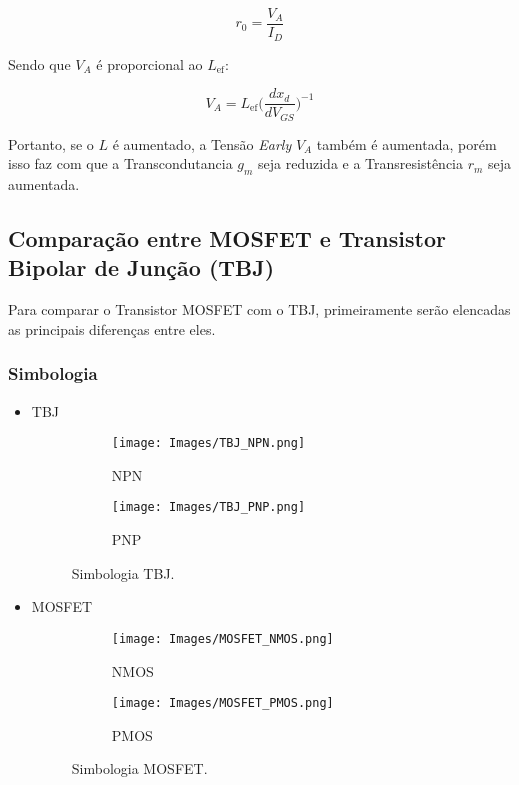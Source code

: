 \documentclass[12pt]{article}
\begin{document}
$$
  r_0 = \frac{V_A}{I_D}
$$

Sendo que $V_A$ é proporcional ao $L_{\text{ef}}$:

$$
  V_A = L_{\text{ef}} \Big ( \frac{dx_d}{dV_{GS}} \Big ) ^{-1}
$$

Portanto, se o $L$ é aumentado, a Tensão \textit{Early} $V_A$ também é aumentada, porém isso faz com que a Transcondutancia $g_m$ seja reduzida e a Transresistência $r_m$ seja aumentada.

\subsection{Comparação entre MOSFET e Transistor Bipolar de Junção (TBJ)}

Para comparar o Transistor MOSFET com o TBJ, primeiramente serão elencadas as principais diferenças entre eles.

\subsubsection{Simbologia}

\begin{itemize}
  \item TBJ
  
  \begin{figure}[H]
    \centering
    \begin{subfigure}{.5\linewidth}
      \centering
      \texttt{[image: Images/TBJ\_NPN.png]}
      \caption{NPN}
    \end{subfigure}%
    \begin{subfigure}{.5\linewidth}
      \centering
      \texttt{[image: Images/TBJ\_PNP.png]}
      \caption{PNP}
    \end{subfigure}
    \caption{Simbologia TBJ.}
    \end{figure}

  \item MOSFET
  
  \begin{figure}[H]
    \centering
    \begin{subfigure}{.5\linewidth}
      \centering
      \texttt{[image: Images/MOSFET\_NMOS.png]}
      \caption{NMOS}
    \end{subfigure}%
    \begin{subfigure}{.5\linewidth}
      \centering
      \texttt{[image: Images/MOSFET\_PMOS.png]}
      \caption{PMOS}
    \end{subfigure}
    \caption{Simbologia MOSFET.}
    \end{figure}

\end{itemize}
\end{document}
